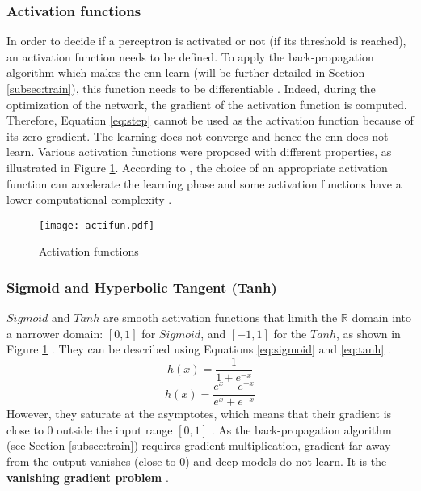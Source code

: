 \subsubsection{Activation functions} \label{subs:acti}
In order to decide if a perceptron is activated or not (if its threshold is reached), an activation function needs to be defined. To apply the back-propagation algorithm which makes the \acrshort{cnn} learn (will be further detailed in Section \ref{subsec:train}), this function needs to be differentiable \cite{lecun_backpropagation_1989}. Indeed, during the optimization of the network, the gradient of the activation function is computed. Therefore, Equation \ref{eq:step} cannot be used as the activation function because of its zero gradient. The learning does not converge and hence the \acrshort{cnn} does not learn. Various activation functions were proposed with different properties, as illustrated in Figure \ref{fig:acti}. According to \textcite{khan_survey_2020}, the choice of an appropriate activation function can accelerate the learning phase and some activation functions have a lower computational complexity \cite{krizhevsky_imagenet_2012}.
%
\begin{figure}[H]
    \centering
    \texttt{[image: actifun.pdf]}
    \caption{Activation functions}
    \label{fig:acti}
\end{figure}
%
\subsubsection{Sigmoid and Hyperbolic Tangent (Tanh)}
$Sigmoid$ and $Tanh$ are smooth activation functions that limith the $\mathbb{R}$ domain into a narrower domain: $[0, 1]$ for $Sigmoid$, and $[-1, 1]$ for the $Tanh$, as shown in Figure \ref{fig:acti} \cite{matteucci_artificial_2019}. They can be described using Equations \eqref{eq:sigmoid} and \eqref{eq:tanh} \cite{krizhevsky_imagenet_2012}.
%
\begin{equation}
    h(x) = \frac{1}{1 + e^{-x}}
    \label{eq:sigmoid}
\end{equation}
%
\begin{equation}
    h(x) = \frac{e^{x} - e^{-x}}{e^{x} + e^{-x}}
    \label{eq:tanh}
\end{equation}
%
However, they saturate at the asymptotes, which means that their gradient is close to 0 outside the input range $[0, 1]$ \cite{glorot_understanding_2010}. As the back-propagation algorithm (see Section \ref{subsec:train}) requires gradient multiplication, gradient far away from the output vanishes (close to 0) and deep models do not learn. It is the \textbf{vanishing gradient problem} \cite{khan_survey_2020, matteucci_artificial_2019, goodfellow_deep_2016, maas_rectier_2013}.
%
